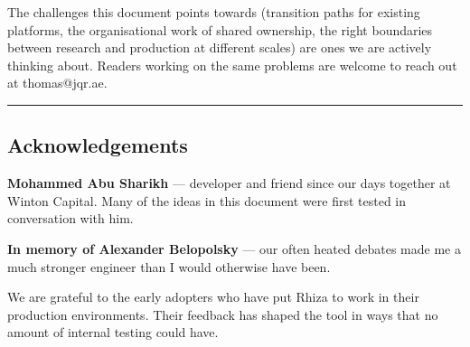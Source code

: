 \documentclass[
  11pt,
]{article}
\begin{document}
The challenges this document points towards (transition paths for
existing platforms, the organisational work of shared ownership, the
right boundaries between research and production at different scales)
are ones we are actively thinking about. Readers working on the
same problems are welcome to reach out at thomas@jqr.ae.

\begin{center}\rule{0.5\linewidth}{0.5pt}\end{center}

\subsection{Acknowledgements}\label{acknowledgements}

\textbf{Mohammed Abu Sharikh} --- developer and friend since our days
together at Winton Capital. Many of the ideas in this document were
first tested in conversation with him.

\textbf{In memory of Alexander Belopolsky} --- our often heated debates
made me a much stronger engineer than I would otherwise have been.

We are grateful to the early adopters who have put Rhiza to work in
their production environments. Their feedback has shaped the tool in
ways that no amount of internal testing could have.
\end{document}
